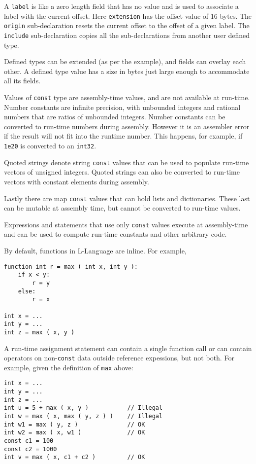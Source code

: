 \documentclass[12pt]{article}
\newenvironment{indpar}[1][0.3in]%
	{\begin{list}{}%
		     {\setlength{\itemsep}{0in}%
		      \setlength{\topsep}{0in}%
		      \setlength{\parsep}{1ex}%
		      \setlength{\labelwidth}{#1}%
		      \setlength{\leftmargin}{#1}%
		      \addtolength{\leftmargin}{\labelsep}}%
	 \item}%
	{\end{list}}
\begin{document}
A {\tt label} is like a zero length field that has no value and
is used to associate a label with the current offset.
Here {\tt extension} has the offset value of 16 bytes.
The {\tt origin} sub-declaration resets the current offset to the offset
of a given label.
The {\tt include} sub-declaration copies all the sub-declarations
from another user defined type.

Defined types can be extended
(as per the example), and fields can overlay each other.
A defined type value has a size in bytes just large enough to
accommodate all its fields.

Values of {\tt const} type are assembly-time values, and are
not available at run-time.  Number constants are infinite
precision, with unbounded integers and rational numbers that
are ratios of unbounded integers.  Number constants
can be converted to run-time numbers during assembly.
However it is an assembler error
if the result will not fit into the runtime number.
This happens, for example, if {\tt 1e20}
is converted to an {\tt int32}.

Quoted strings denote string {\tt const} values that can be
used to populate run-time vectors of unsigned integers.
Quoted strings can also be converted to run-time vectors
with constant elements during assembly.

Lastly there are map {\tt const} values that can hold lists
and dictionaries.  These last can be mutable at assembly time,
but cannot be converted to run-time values.

Expressions and statements that use only {\tt const} values
execute at assembly-time and can be used to compute run-time
constants and other arbitrary code.

By default, functions in L-Language are inline.  For example,

\begin{indpar}\begin{verbatim}
function int r = max ( int x, int y ):
    if x < y:
        r = y
    else:
        r = x

int x = ...
int y = ...
int z = max ( x, y )
\end{verbatim}\end{indpar}

A run-time assignment statement can contain a single function call
or can contain operators on non-{\tt const} data
outside reference expessions, but not both.
For example, given the definition of {\tt max} above:

\begin{indpar}\begin{verbatim}
int x = ...
int y = ...
int z = ...
int u = 5 + max ( x, y )           // Illegal
int w = max ( x, max ( y, z ) )    // Illegal
int w1 = max ( y, z )              // OK
int w2 = max ( x, w1 )             // OK
const c1 = 100
const c2 = 1000
int v = max ( x, c1 + c2 )         // OK
\end{verbatim}\end{indpar}
\end{document}
